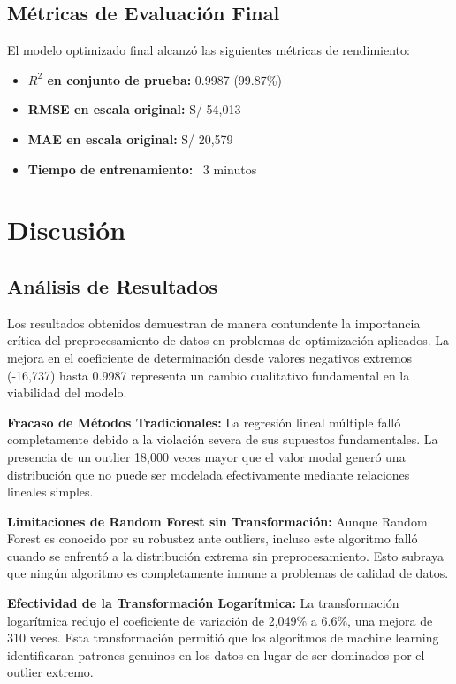 \documentclass[12pt,a4paper]{article}
\begin{document}
\subsection{Métricas de Evaluación Final}

El modelo optimizado final alcanzó las siguientes métricas de rendimiento:

\begin{itemize}
    \item \textbf{$R^2$ en conjunto de prueba:} 0.9987 (99.87\%)
    \item \textbf{RMSE en escala original:} S/ 54,013
    \item \textbf{MAE en escala original:} S/ 20,579
    \item \textbf{Tiempo de entrenamiento:} ~3 minutos
\end{itemize}

\section{Discusión}

\subsection{Análisis de Resultados}

Los resultados obtenidos demuestran de manera contundente la importancia crítica del preprocesamiento de datos en problemas de optimización aplicados. La mejora en el coeficiente de determinación desde valores negativos extremos (-16,737) hasta 0.9987 representa un cambio cualitativo fundamental en la viabilidad del modelo.

\textbf{Fracaso de Métodos Tradicionales:}
La regresión lineal múltiple falló completamente debido a la violación severa de sus supuestos fundamentales. La presencia de un outlier 18,000 veces mayor que el valor modal generó una distribución que no puede ser modelada efectivamente mediante relaciones lineales simples.

\textbf{Limitaciones de Random Forest sin Transformación:}
Aunque Random Forest es conocido por su robustez ante outliers, incluso este algoritmo falló cuando se enfrentó a la distribución extrema sin preprocesamiento. Esto subraya que ningún algoritmo es completamente inmune a problemas de calidad de datos.

\textbf{Efectividad de la Transformación Logarítmica:}
La transformación logarítmica redujo el coeficiente de variación de 2,049\% a 6.6\%, una mejora de 310 veces. Esta transformación permitió que los algoritmos de machine learning identificaran patrones genuinos en los datos en lugar de ser dominados por el outlier extremo.
\end{document}
